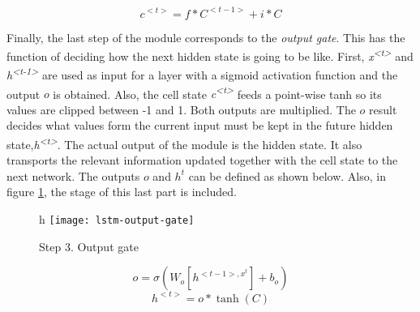	
	\[c^{<t>} = f * C^{<t-1>} + i * C\]
	
				
	Finally, the last step of the module corresponds to the \textit{output gate}. This has the function of deciding how the next hidden state is going to be like. First, \textit{x\textsuperscript{<t>}} and \textit{h\textsuperscript{<t-1>}} are used as input for a layer with a sigmoid activation function and the output $o$ is obtained. Also, the cell state \textit{c\textsuperscript{<t>}} feeds a point-wise \acrshort{tanh} so its values are clipped between -1 and 1. Both outputs are multiplied. The $o$ result decides what values form the current input must be kept in the future hidden state,\textit{h\textsuperscript{<t>}}. The actual output of the module is the hidden state. It also transports the relevant information updated together with the cell state to the next network. The outputs $o$ and $h^{t}$ can be defined as shown below. Also, in figure \ref{fig:mesh45}, the stage of this last part is included.
		
	\begin{figure}{h}
		\centering
		\captionsetup{justification=centering}
		\texttt{[image: lstm-output-gate]}
		\caption{Step 3. Output gate}
		\label{fig:mesh45}
	\end{figure}
	
	\[ o = \sigma(W_{o}[h^{<t-1>, x^{t}}] + b_{o}) \]
	\[ h^{<t>} = o * \tanh(C) \]
	
	
	
	